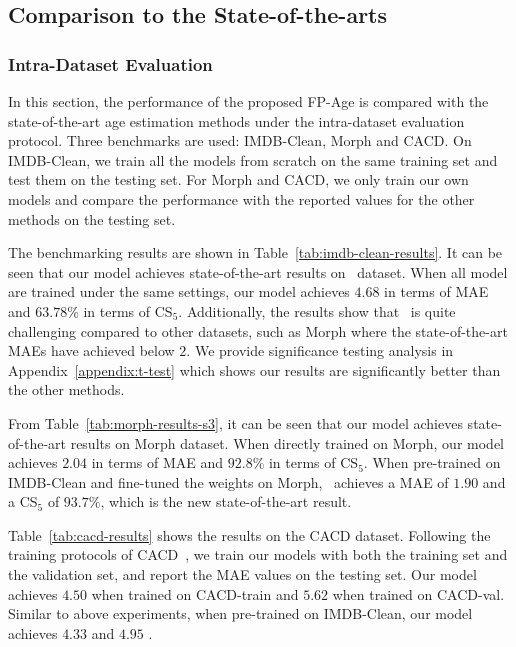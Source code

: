 \subsection{Comparison to the State-of-the-arts} \label{sec:compare-sotas}
\subsubsection{Intra-Dataset Evaluation}
In this section, the performance of the proposed FP-Age is compared with the state-of-the-art age estimation methods under the intra-dataset evaluation protocol. Three benchmarks are used: IMDB-Clean, Morph and CACD. On IMDB-Clean, we train all the models from scratch on the same training set and test them on the testing set. For Morph and CACD, we only train our own models and compare the performance with the reported values for the other methods on the testing set.


The benchmarking results are shown in Table~\ref{tab:imdb-clean-results}. It can be seen that our model achieves state-of-the-art results on \imdbc~dataset. When all model are trained under the same settings, our model achieves $4.68$ in terms of MAE and $63.78\%$ in terms of CS$_5$. Additionally, the results show that \imdbc~is quite challenging compared to other datasets, such as Morph where the state-of-the-art MAEs have achieved below $2$. We provide significance testing analysis in Appendix~\ref{appendix:t-test} which shows our results are significantly better than the other methods.

From Table~\ref{tab:morph-results-s3}, it can be seen that our model achieves state-of-the-art results on Morph dataset. When directly trained on Morph, our model achieves $2.04$ in terms of MAE and $92.8\%$ in terms of CS$_5$. When pre-trained on IMDB-Clean and fine-tuned the weights on Morph, \fpage~achieves a MAE of $1.90$ and a  CS$_5$ of $93.7\%$, which is the new state-of-the-art result.

Table~\ref{tab:cacd-results} shows the results on the CACD dataset. Following the training protocols of CACD~\cite{shenDeepRegressionForests2018}, we train our models with both the training set and the validation set, and report the MAE values on the testing set. Our model achieves $4.50$ when trained on CACD-train and $5.62$ when trained on CACD-val. Similar to above experiments, when pre-trained on IMDB-Clean, our model achieves $4.33$ and $4.95$ .  

